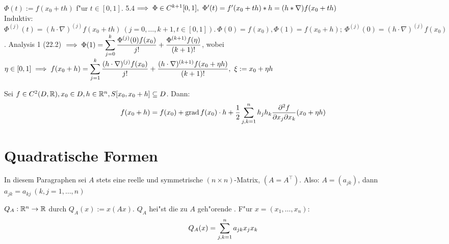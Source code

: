 \documentclass[a4paper,twoside,DIV15,BCOR12mm]{scrbook}
\begin{document}
\begin{beweis}
$\Phi(t):=f(x_0+th)$ f"ur $t\in[0,1]$. 5.4$\folgt \Phi \in C^{k+1}[0,1],\ \Phi'(t)=f'(x_0+th)*h=(h*\nabla)f(x_0+th)$\\
Induktiv: $\Phi^{(j)}(t)=(h\cdot\nabla)^{(j)}f(x_0+th)\ (j=0,\ldots,k+1, t\in[0,1]).\ \Phi(0)=f(x_0), \Phi(1)=f(x_0+h);\ \Phi^{(j)}(0)=(h\cdot\nabla)^{(j)}f(x_0)$. Analysis 1 (22.2) $\implies \Phi(1)=\displaystyle\sum_{j=0}^k\frac{\Phi^{(j)}(0)f(x_0)}{j!}+\frac{\Phi^{(k+1)}f(\eta)}{(k+1)!}$, wobei $\eta\in[0,1]\implies f(x_0+h)=\displaystyle\sum_{j=1}^k\frac{(h\cdot\nabla)^{(j)}f(x_0)}{j!}+\frac{(h\cdot\nabla)^{(k+1)}f(x_0+\eta h)}{(k+1)!},\ \xi:=x_0+\eta h$
\end{beweis}

\begin{spezialfall}
Sei $f\in C^2(D,\mathbb{R}),x_0\in D, h\in \mathbb{R}^n, S[x_0,x_0+h]\subseteq D$. Dann: 
$$f(x_0+h)=f(x_0)+\grad f(x_0)\cdot h+\frac{1}{2}\sum_{j,k=1}^nh_jh_k\frac{\partial^2 f}{\partial x_j\partial x_k}(x_0+\eta h)$$
\end{spezialfall}

\chapter{Quadratische Formen}
\def\grad{\mathop{\rm grad}\nolimits}

\begin{vereinbarung}
In diesem Paragraphen sei $A$ stets eine reelle und symmetrische $(n\times n)$-Matrix, $(A=A^\top)$. Also: $A=(a_{jk})$, dann $a_{jk}=a_{kj}\ (k,j=1,\ldots,n)$ 
\end{vereinbarung}

\begin{definition*}
$Q_A:\mathbb{R}^n\to\mathbb{R}$ durch $Q_A(x):=x(Ax)$. $Q_A$ hei"st die zu $A$ geh"orende . F"ur $x=(x_1,\ldots,x_n):$
$$Q_A(x)=\displaystyle\sum_{j,k=1}^na_{jk}x_jx_k$$
\end{definition*}
\end{document}
